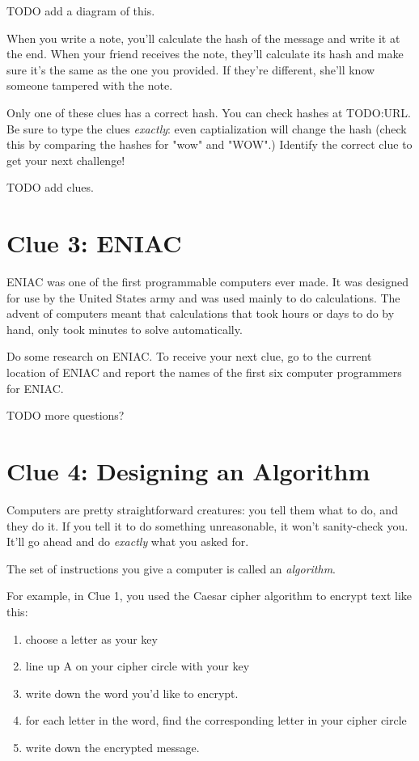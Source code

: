 \documentclass{article}
\begin{document}
TODO add a diagram of this.

When you write a note, you'll calculate the hash of the message and write it at the end. When your friend receives the note, they'll calculate its hash and make sure it's the same as the one you provided. If they're different, she'll know someone tampered with the note.

Only one of these clues has a correct hash. You can check hashes at TODO:URL. Be sure to type the clues \textit{exactly}: even captialization will change the hash (check this by comparing the hashes for "wow" and "WOW".) Identify the correct clue to get your next challenge!

TODO add clues.

\newpage

\section*{Clue 3: ENIAC}
ENIAC was one of the first programmable computers ever made. It was designed for use by the United States army and was used mainly to do calculations. The advent of computers meant that calculations that took hours or days to do by hand, only took minutes to solve automatically.

Do some research on ENIAC. To receive your next clue, go to the current location of ENIAC and report the names of the first six computer programmers for ENIAC.

TODO more questions?

\newpage

\section*{Clue 4: Designing an Algorithm}
Computers are pretty straightforward creatures: you tell them what to do, and they do it. If you tell it to do something unreasonable, it won't sanity-check you. It'll go ahead and do \textit{exactly} what you asked for.

The set of instructions you give a computer is called an \textit{algorithm}. 

For example, in Clue 1, you used the Caesar cipher algorithm to encrypt text like this:
\begin{enumerate}[noitemsep]
  \item choose a letter as your key
  \item line up A on your cipher circle with your key
  \item write down the word you'd like to encrypt.
  \item for each letter in the word, find the corresponding letter in your cipher circle
  \item write down the encrypted message.
\end{enumerate}
\end{document}
